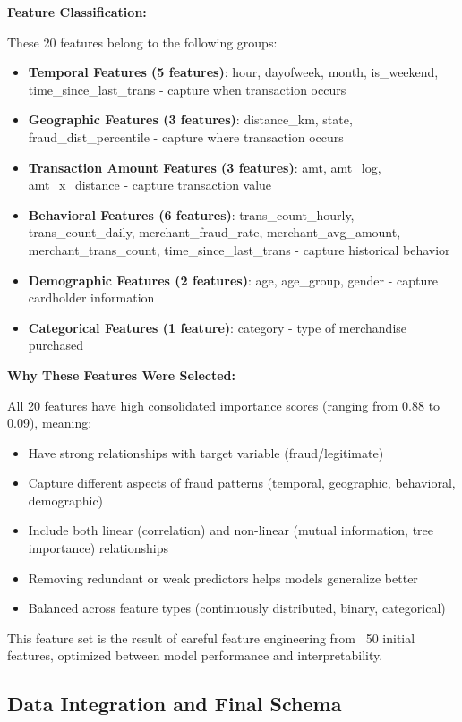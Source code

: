 \textbf{Feature Classification:}

These 20 features belong to the following groups:

\begin{itemize}
    \item \textbf{Temporal Features (5 features)}: hour, dayofweek, month, is\_weekend, time\_since\_last\_trans - capture when transaction occurs
    \item \textbf{Geographic Features (3 features)}: distance\_km, state, fraud\_dist\_percentile - capture where transaction occurs
    \item \textbf{Transaction Amount Features (3 features)}: amt, amt\_log, amt\_x\_distance - capture transaction value
    \item \textbf{Behavioral Features (6 features)}: trans\_count\_hourly, trans\_count\_daily, merchant\_fraud\_rate, merchant\_avg\_amount, merchant\_trans\_count, time\_since\_last\_trans - capture historical behavior
    \item \textbf{Demographic Features (2 features)}: age, age\_group, gender - capture cardholder information
    \item \textbf{Categorical Features (1 feature)}: category - type of merchandise purchased
\end{itemize}

\textbf{Why These Features Were Selected:}

All 20 features have high consolidated importance scores (ranging from 0.88 to 0.09), meaning:
\begin{itemize}
    \item Have strong relationships with target variable (fraud/legitimate)
    \item Capture different aspects of fraud patterns (temporal, geographic, behavioral, demographic)
    \item Include both linear (correlation) and non-linear (mutual information, tree importance) relationships
    \item Removing redundant or weak predictors helps models generalize better
    \item Balanced across feature types (continuously distributed, binary, categorical)
\end{itemize}

This feature set is the result of careful feature engineering from ~50 initial features, optimized between model performance and interpretability.

\subsection{Data Integration and Final Schema}

